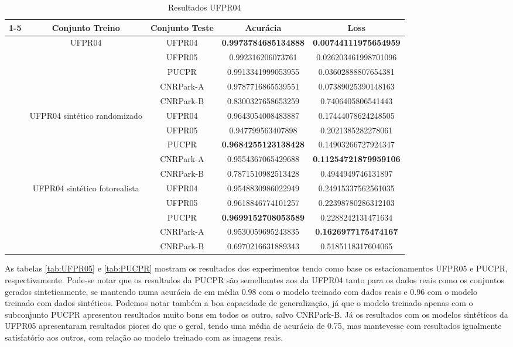 \begin{table}[!htp] 
\centering
\caption{Resultados UFPR04}
\label{tab:UFPR04}
\begin{tabular}{|c|cccc|}
\cline{1-5}
\multicolumn{1}{|}{} & Conjunto Treino & Conjunto Teste & Acurácia & Loss \\
\hline
\texttt{} & UFPR04 & UFPR04 & \textbf{0.9973784685134888} & \textbf{0.00744111975654959} \\
\texttt{} &  & UFPR05 & 0.992316206073761 & 0.026203461998701096 \\
\texttt{} &  & PUCPR & 0.9913341999053955 & 0.03602888807654381 \\
\texttt{} &  & CNRPark-A & 0.9787716865539551 & 0.07389025390148163 \\
\texttt{} &  & CNRPark-B & 0.8300327658653259 & 0.7406405806541443 \\
\hline
\texttt{} & UFPR04 sintético randomizado & UFPR04 & 0.9643054008483887 & 0.17444078624248505 \\
\texttt{} &  & UFPR05 & 0.947799563407898 & 0.2021385282278061 \\
\texttt{} &  & PUCPR & \textbf{0.9684255123138428} & 0.14903266727924347 \\
\texttt{} &  & CNRPark-A & 0.9554367065429688 & \textbf{0.11254721879959106} \\
\texttt{} &  & CNRPark-B & 0.7871510982513428 & 0.4944949746131897 \\
\hline
\texttt{} & UFPR04 sintético fotorealista & UFPR04 & 0.9548830986022949 & 0.24915337562561035 \\
\texttt{} &  & UFPR05 & 0.9618846774101257 & 0.22398780286312103 \\
\texttt{} &  & PUCPR & \textbf{0.9699152708053589} & 0.2288242131471634 \\
\texttt{} &  & CNRPark-A & 0.9530059695243835 & \textbf{0.1626977175474167} \\
\texttt{} &  & CNRPark-B & 0.6970216631889343 & 0.5185118317604065 \\
\hline
\end{tabular}
\end{table}

As tabelas \ref{tab:UFPR05} e \ref{tab:PUCPR} mostram os resultados dos experimentos tendo como base os estacionamentos UFPR05 e PUCPR, respectivamente. Pode-se notar que os resultados da PUCPR são semelhantes aos da UFPR04 tanto para os dados reais como os conjuntos gerados sinteticamente, se mantendo numa acurácia de em média 0.98 com o modelo treinado com dados reais e 0.96 com o modelo treinado com dados sintéticos. Podemos notar também a boa capacidade de generalização, já que o modelo treinado apenas com o subconjunto PUCPR apresentou resultados muito bons em todos os outro, salvo CNRPark-B. Já os resultados com os modelos sintéticos da UFPR05 apresentaram resultados piores do que o geral, tendo uma média de acurácia de 0.75, mas mantevesse com resultados igualmente satisfatório aos outros, com relação ao modelo treinado com as imagens reais.

